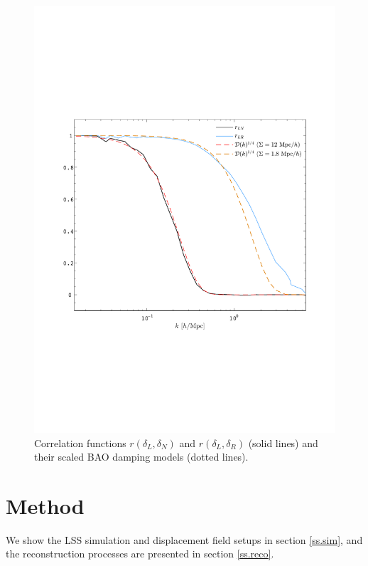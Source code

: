 \documentclass[aps,prd,twocolumn,superscriptaddress,amsfont,amssymb,amsmath,nofootinbib,showpacs,balancelastpage]{revtex4-1}
\begin{document}
\begin{figure}[t] \centering
  \includegraphics[width=1.0\linewidth]{filter.pdf}
  \caption{Correlation functions $r(\delta_L,\delta_N)$ and $r(\delta_L,\delta_R)$
  (solid lines) and their scaled BAO damping models (dotted lines).}
  \label{fig.corr}
\end{figure}



\section{Method}\label{sec.method}
We show the LSS simulation and displacement field setups in section \ref{ss.sim},
and the reconstruction processes are presented in section \ref{ss.reco}.
\end{document}
